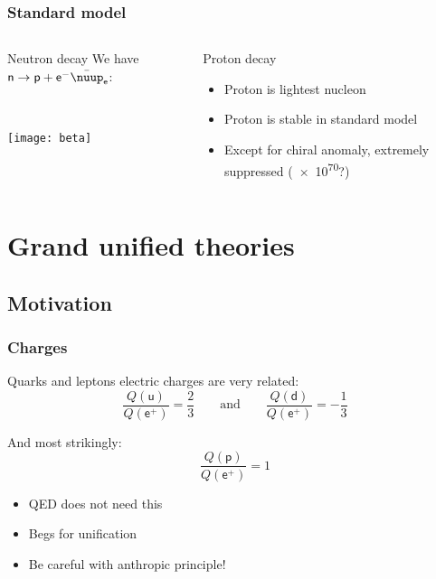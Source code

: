 \documentclass[english, fleqn]{beamer}
\newcommand\qqandqq{\qquad\text{and}\qquad}
\begin{document}
\begin{frame}
    \frametitle{Standard model}

    \begin{columns}[t]
        \begin{column}{.5\linewidth}
            \begin{block}{Neutron decay}
                We have $\mathsf n \to \mathsf p + \mathsf e^- \bar\nuup_{\mathsf e}$:

                \

                \texttt{[image: beta]}
            \end{block}
        \end{column}
        \pause
        \begin{column}{.5\linewidth}
            \begin{block}{Proton decay}
                \begin{itemize}
                    \item Proton is lightest nucleon
                    \item \alert{Proton is stable in standard model}
                    \item Except for chiral anomaly, extremely suppressed
                        \parencite[6]{wiesenfeldt/dissertation}
                        (\SI{e70}{\year}?)
                \end{itemize}
            \end{block}
        \end{column}
    \end{columns}
\end{frame}
\section{Grand unified theories}

\subsection{Motivation}

\begin{frame}
    \frametitle{Charges}

    Quarks and leptons electric charges are very related:
    \[
        \frac{Q(\mathsf u)}{Q(\mathsf e^+)} = \frac 23
        \qqandqq
        \frac{Q(\mathsf d)}{Q(\mathsf e^+)} = - \frac 13
    \]

    \pause

    And most strikingly:
    \[
        \frac{Q(\mathsf p)}{Q(\mathsf e^+)} = 1
    \]

    \pause

    \begin{itemize}
        \item QED does not need this
        \item Begs for unification
        \item Be careful with anthropic principle!
    \end{itemize}
\end{frame}
\end{document}
